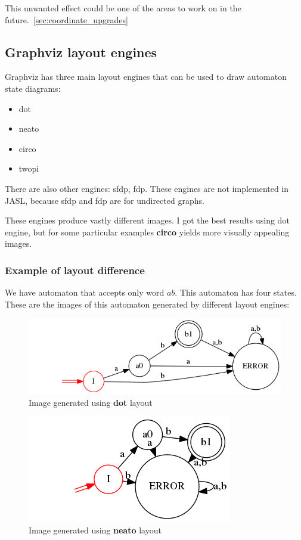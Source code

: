 \documentclass{ctuthesis}
\begin{document}
This unwanted effect could be one of the areas to work on in the future.~\ref{sec:coordinate_upgrades}

\subsection{Graphviz layout engines}
Graphviz has three main layout engines that can be used to draw automaton state diagrams:
\begin{itemize}
	\item dot
	\item neato
	\item circo
	\item twopi
\end{itemize}

There are also other engines: sfdp, fdp. These engines are not implemented in JASL, because sfdp and fdp are for undirected graphs.

These engines produce vastly different images. I got the best results using dot engine, but for some particular examples \textbf{circo} yields more visually appealing images.

\subsubsection{Example of layout difference}
We have automaton that accepts only word $ab$. This automaton has four states. These are the images of this automaton generated by different layout engines:

\begin{figure}[H]
\includegraphics[width=0.8\linewidth]{figures/layouts_dot.png}
\caption{Image generated using \textbf{dot} layout}
\label{fig:layout_diff_dot}
\end{figure}

\begin{figure}[H]
\includegraphics[width=0.7\linewidth]{figures/layouts_neato.png}
\caption{Image generated using \textbf{neato} layout}
\label{fig:layout_diff_neato}
\end{figure}
\end{document}
